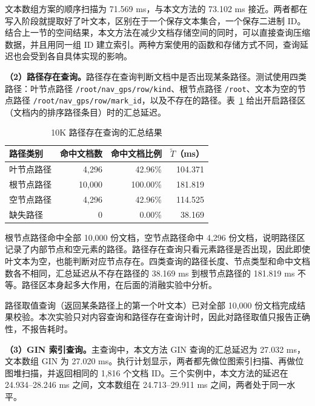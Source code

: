 文本数组方案的顺序扫描为 71.569 ms，与本文方法的 73.102 ms 接近。两者都在写入阶段就提取好了叶文本，区别在于一个保存文本集合，一个保存二进制 ID。结合上一节的空间结果，本文方法在减少文档存储空间的同时，可以直接查询压缩数据，并且用同一组 ID 建立索引。两种方案使用的函数和存储方式不同，查询延迟也会受到各自具体实现的影响。

\textbf{（2）路径存在查询。}路径存在查询判断文档中是否出现某条路径。测试使用四类路径：叶节点路径 \nolinkurl{/root/nav_gps/row/kind}、根节点路径 \nolinkurl{/root}、文本为空的节点路径 \nolinkurl{/root/nav_gps/row/mark_id}，以及不存在的路径。表~\ref{tab:exp-path-query} 给出开启路径区（文档内的排序路径条目）时的汇总延迟。
\begin{table}[htbp]
\centering\small
\caption{10K 路径存在查询的汇总结果}
\label{tab:exp-path-query}
\begin{tabular}{lrrr}
\toprule
路径类别 & 命中文档数 & 命中文档比例 & $\widetilde{T}$（ms） \\
\midrule
叶节点路径 & 4,296 & 42.96\% & 104.371 \\
根节点路径 & 10,000 & 100.00\% & 181.819 \\
空节点路径 & 4,296 & 42.96\% & 114.525 \\
缺失路径 & 0 & 0.00\% & 38.169 \\
\bottomrule
\end{tabular}
\end{table}

根节点路径命中全部 10,000 份文档，空节点路径命中 4,296 份文档，说明路径区记录了内部节点和空元素的路径。路径存在查询只看元素路径是否出现，因此即使叶文本为空，也能判断对应节点存在。四类查询的路径长度、节点类型和命中文档数各不相同，汇总延迟从不存在路径的 38.169 ms 到根节点路径的 181.819 ms 不等。路径区本身起多大作用，在后面的消融实验中分析。

路径取值查询（返回某条路径上的第一个叶文本）已对全部 10,000 份文档完成结果校验。本次实验只对内容查询和路径存在查询计时，因此对路径取值只报告正确性，不报告耗时。

\textbf{（3）GIN 索引查询。}主查询中，本文方法 GIN 查询的汇总延迟为 27.032 ms，文本数组 GIN 为 27.020 ms。执行计划显示，两者都先做位图索引扫描、再做位图堆扫描，并返回相同的 1,816 个文档 ID。三个实例中，本文方法的延迟在 24.934--28.246 ms 之间，文本数组在 24.713--29.911 ms 之间，两者处于同一水平。

